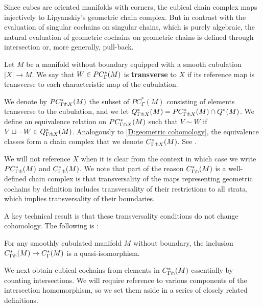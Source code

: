 Since cubes are oriented manifolds with corners, the cubical chain complex maps injectively to Lipyanskiy's geometric chain complex.
But in contrast with the evaluation of singular cochains on singular chains, which is purely algebraic, the natural evaluation of geometric cochains on geometric chains is defined through intersection or, more generally, pull-back.

\begin{definition}
	Let $M$ be a manifold without boundary equipped with a smooth cubulation $|X| \to M$.
	We say that $W \in PC_\Gamma^*(M)$ is \textbf{transverse} to $X$ if its reference map is transverse to each characteristic map of the cubulation.

	We denote by $PC^*_{\Gamma \pitchfork X}(M)$ the subset of $PC_\Gamma^*(M)$ consisting of elements transverse to the cubulation, and we let $Q^*_{\Gamma \pitchfork X}(M) = PC^*_{\Gamma \pitchfork X}(M) \cap Q^*(M)$.
	We define an equivalence relation on $PC^*_{\Gamma \pitchfork X}(M)$ such that $V \sim W$ if $V \sqcup -W \in Q^*_{\Gamma \pitchfork X}(M)$.
	Analogously to \cref{D:geometric cohomology}, the equivalence classes form a chain complex that we denote $C^*_{\Gamma \pitchfork X}(M)$.
	See \cite[Section 6.4]{medina2022foundations}.
\end{definition}

We will not reference $X$ when it is clear from the context in which case we write $PC_{\Gamma \pitchfork}^*(M)$ and $C^*_{\Gamma \pitchfork}(M)$.
We note that part of the reason $C^*_{\Gamma \pitchfork}(M)$ is a well-defined chain complex is that transversality of the maps representing geometric cochains by definition includes transversality of their restrictions to all strata, which implies transversality of their boundaries.

A key technical result is that these transversality conditions do not change cohomology.
The following is \cite[Theorem 6.5]{medina2022foundations}:

\begin{theorem}\label{T:transverse complex}
	For any smoothly cubulated manifold $M$ without boundary, the inclusion $C^*_{\Gamma \pitchfork}(M) \to C^*_\Gamma(M)$ is a quasi-isomorphism.
\end{theorem}

We next obtain cubical cochains from elements in $C^*_{\Gamma \pitchfork}(M)$ essentially by counting intersections.
We will require reference to various components of the intersection homomorphism, so we set them aside in a series of closely related definitions.

